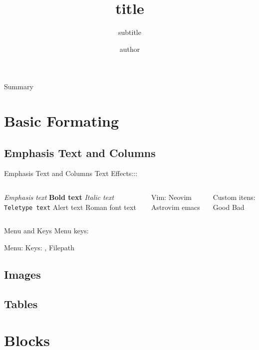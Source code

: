 \documentclass[lang=en-us, aspectratio=169,tokyonight-storm,Frankfurt, 90pt]{darkbeamer}
\author{author}
\title{title}
\subtitle{subtitle}
\institute{My University}
\begin{document}
\begin{frame}{}
	\titlepage
\end{frame}

\begin{frame}{Summary}
	\label{contents}
	\tableofcontents
\end{frame}

\section{Basic Formating}
\subsection{Emphasis Text and Columns}
\begin{frame}{Emphasis Text and Columns}
	Text Effects:::
	\begin{columns}[c]
		\begin{outline}
			\1 \emph{Emphasis text}
			\1 \textbf{Bold text}
			\1 \textit{Italic text}
			\1 \texttt{Teletype text}
			\1 \alert{Alert text}
			\1 \textrm{Roman font text}
		\end{outline}
		\column{.45\textwidth}
		\begin{outline}[enumerate]
			\1 Vim:
			\2 Neovim
			\2 Astrovim
			\1 emacs
		\end{outline}
		\begin{outline}
			\1 Custom itens:
			\2[\gd] Good
			\2[\bd] Bad
		\end{outline}
	\end{columns}
\end{frame}

\begin{frame}{Menu and Keys}
    Menu keys:
    \begin{outline}
        \1 Menu: 
		  \1 Keys: , \keys{\ctrl +v}
        \1 Filepath  
    \end{outline}
\end{frame}

\subsection{Images}
\subsection{Tables}

\section{Blocks}
\end{document}

